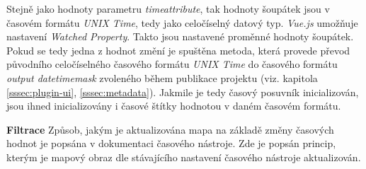 Stejně jako hodnoty parametru \textit{time\textunderscore attribute},
tak hodnoty šoupátek jsou v časovém formátu \textit{UNIX Time}, tedy
jako celočíselný datový typ. \textit{Vue.js} umožňuje nastavení
\textit{Watched Property}. Takto jsou nastavené proměnné hodnoty
šoupátek. Pokud se tedy jedna z hodnot změní je spuštěna metoda,
která provede převod původního celočíselného časového formátu
\textit{UNIX Time} do časového formátu \textit{output\textunderscore
datetime\textunderscore mask} zvoleného během publikace projektu
(viz. kapitola \ref{sssec:plugin-ui}, \ref{sssec:metadata}). Jakmile je tedy
časový posuvník inicializován, jsou ihned inicializovány i časové
štítky hodnotou v daném časovém formátu.

\bigskip
\noindent \textbf{Filtrace}
Způsob, jakým je aktualizována mapa na základě změny časových hodnot je
popsána v dokumentaci časového nástroje. Zde je popsán princip, kterým je
mapový obraz dle stávajícího nastavení časového nástroje aktualizován.


